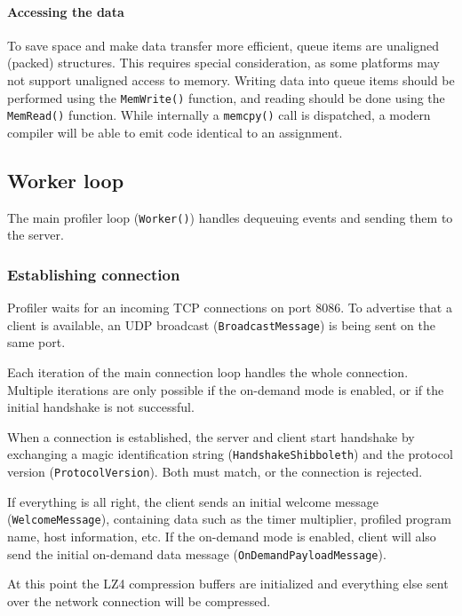 \documentclass[hidelinks,titlepage,a4paper]{article}
\begin{document}
\paragraph{Accessing the data}
\label{accessingdata}

To save space and make data transfer more efficient, queue items are unaligned (packed) structures. This requires special consideration, as some platforms may not support unaligned access to memory. Writing data into queue items should be performed using the \texttt{MemWrite()} function, and reading should be done using the \texttt{MemRead()} function. While internally a \texttt{memcpy()} call is dispatched, a modern compiler will be able to emit code identical to an assignment.

\subsection{Worker loop}
\label{workerloop}

The main profiler loop (\texttt{Worker()}) handles dequeuing events and sending them to the server.

\subsubsection{Establishing connection}

Profiler waits for an incoming TCP connections on port 8086. To advertise that a client is available, an UDP broadcast (\texttt{BroadcastMessage}) is being sent on the same port.

Each iteration of the main connection loop handles the whole connection. Multiple iterations are only possible if the on-demand mode is enabled, or if the initial handshake is not successful.

When a connection is established, the server and client start handshake by exchanging a magic identification string (\texttt{HandshakeShibboleth}) and the protocol version (\texttt{ProtocolVersion}). Both must match, or the connection is rejected.

If everything is all right, the client sends an initial welcome message (\texttt{WelcomeMessage}), containing data such as the timer multiplier, profiled program name, host information, etc. If the on-demand mode is enabled, client will also send the initial on-demand data message (\texttt{OnDemandPayloadMessage}).

At this point the LZ4 compression buffers are initialized and everything else sent over the network connection will be compressed.
\end{document}
